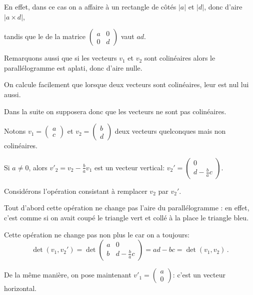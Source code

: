\change
En effet, dans ce cas on a affaire à un rectangle de côtés $|a|$ et $|d|$, donc d'aire
$|a \times d|$, 

\change
tandis que le \deter de la matrice 
$\begin{pmatrix}
	a&0\\0&d
\end{pmatrix}$
vaut $ad$.

\change
Remarquons aussi que si les vecteurs $v_1$ et $v_2$ sont colinéaires alors
le parallélogramme est aplati, donc d'aire nulle.

\change
On calcule facilement
que lorsque deux vecteurs sont colinéaires, leur \deter est nul lui aussi.

\change
Dans la suite on supposera donc que les vecteurs ne sont pas colinéaires.

\diapo
Notons $v_1= \left(\begin{smallmatrix}a \\[5pt] c\end{smallmatrix}\right)$ et 
$v_2= \left(\begin{smallmatrix}b \\[5pt] d\end{smallmatrix}\right)$ deux vecteurs 
quelconques mais non colinéaires.

\change
Si $a\neq0$, alors $v'_2=v_2-\frac{b}{a}v_1$ est un vecteur vertical:
$v_2'=\left(\begin{smallmatrix}0 \\[5pt] d-\frac{b}{a}c\end{smallmatrix}\right)$.

\change
Considérons l'opération consistant à remplacer $v_2$ par $v_2'$.

\change
Tout d'abord cette opération ne change pas l'aire du parallélogramme : 
en effet, c'est comme si on avait coupé le triangle vert
et collé à la place le triangle bleu.

\change
Cette opération ne change pas non plus le \deter car on a toujours:
$$\det (v_1,v_2')= 
\det \begin{pmatrix}
a & 0 \\ b & d-\frac{b}{a}c
\end{pmatrix}
=ad-bc=\det(v_1,v_2)\, .$$


\diapo

De la m\^eme manière, on pose maintenant
$v'_1= \left(\begin{smallmatrix}a \\[5pt] 0\end{smallmatrix}\right)$: c'est un vecteur horizontal. 

